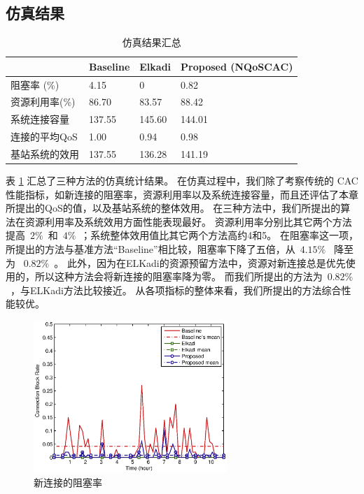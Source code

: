 \subsection{仿真结果}
%
\begin{table}[htbp]
\caption{仿真结果汇总} \label{tb:chap_cacop:res_sim}
\begin{center}
\wuhao
\begin{tabularx}{0.99\textwidth}{XXXX}
\toprule
&Baseline &Elkadi &Proposed (NQoSCAC)\\
\midrule
阻塞率 (\%) &4.15 & 0 &0.82\\
资源利用率(\%) &86.70 &83.57 &88.42\\
系统连接容量 &137.55 &145.60 &144.01\\
连接的平均QoS &1.00 &0.94 &0.98\\
基站系统的效用 &137.55 &136.28 &141.19\\
\bottomrule
\end{tabularx}
\end{center}
\end{table}
表 \ref{tb:chap_cacop:res_sim} 汇总了三种方法的仿真统计结果。
在仿真过程中，我们除了考察传统的 CAC 性能指标，如新连接的阻塞率，资源利用率以及系统连接容量，而且还评估了本章所提出的QoS的值，以及基站系统的整体效用。
在三种方法中，我们所提出的算法在资源利用率及系统效用方面性能表现最好。
资源利用率分别比其它两个方法提高~$2\%$~和~$4\%$~；系统整体效用值比其它两个方法高约4和5。
在阻塞率这一项，所提出的方法与基准方法“Baseline”相比较，阻塞率下降了五倍，从~$4.15\%$~ 降至为 ~$0.82\%$~。
此外，因为在ELKadi的资源预留方法中，资源对新连接总是优先使用的，所以这种方法会将新连接的阻塞率降为零。
而我们所提出的方法为~$0.82\%$~，与ELKadi方法比较接近。
从各项指标的整体来看，我们所提出的方法综合性能较优。
%
\begin{figure}[htbp]
\centering
\includegraphics[width=0.65\textwidth] {cacop_block_rate.eps}
\caption{新连接的阻塞率} \label{fig:chap_cacop:clock_accept_block_drop}
\end{figure}

